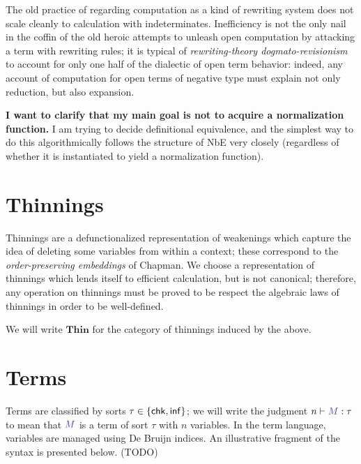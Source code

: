 \documentclass{article}
\DeclarePairedDelimiter\Braces{\lbrace}{\rbrace}
\newcommand\FmtKwd[1]{\mathsf{#1}}
\newcommand\DeclBox[1]{\framebox{$\displaystyle{}#1$}}
\newcommand\FmtThin[1]{{\color{ProcessBlue}#1}}
\newcommand\Thin[2]{{#1}\rightarrowtriangle{#2}}
\newcommand\IsThin[3]{\FmtThin{#1}:\Thin{#2}{#3}}
\newcommand\ThinId{\mathsf{id}}
\newcommand\ThinKeep[1]{\mbox{\leftthumbsdown}\!\!\rangle\!{#1}\!\langle\!\!\mbox{\rightthumbsdown}}
\newcommand\ThinSkip[1]{{#1}.\mbox{\faTrashO}}
\newcommand\THIN{\mathbf{Thin}}
\newcommand\SortChk{\FmtKwd{chk}}
\newcommand\SortInf{\FmtKwd{inf}}
\newcommand\FmtTm[1]{{\color{Violet}#1}}
\newcommand\IsTm[3]{{#1}\vdash\FmtTm{#2}:{#3}}
\begin{document}
The old practice of regarding computation as a kind of rewriting
system does not scale cleanly to calculation with
indeterminates. Inefficiency is not the only nail in the coffin of the
old heroic attempts to unleash open computation by attacking a term
with rewriting rules; it is typical of \emph{rewriting-theory
  dogmato-revisionism} to account for only one half of the dialectic
of open term behavior: indeed, any account of computation for open
terms of negative type must explain not only reduction, but also
expansion.

\textbf{I want to clarify that my main goal is not to acquire a normalization
function.} I am trying to decide definitional equivalence, and the simplest way
to do this algorithmically follows the structure of NbE very closely
(regardless of whether it is instantiated to yield a normalization function).


\section{Thinnings}

Thinnings are a defunctionalized representation of weakenings which
capture the idea of deleting some variables from within a context;
these correspond to the \emph{order-preserving embeddings} of Chapman.
%
We choose a representation of thinnings which lends itself to
efficient calculation, but is not canonical; therefore, any operation
on thinnings must be proved to be respect the algebraic laws of
thinnings in order to be well-defined.

We will write $\THIN$ for the category of thinnings
induced by the above.

\section{Terms}

Terms are classified by sorts $\tau\in\Braces*{\SortChk,\SortInf}$; we
will write the judgment $\IsTm{n}{M}{\tau}$ to mean that $\FmtTm{M}$
is a term of sort $\tau$ with $n$ variables. In the term language,
variables are managed using De Bruijn indices. An illustrative
fragment of the syntax is presented below. (TODO)
\end{document}
